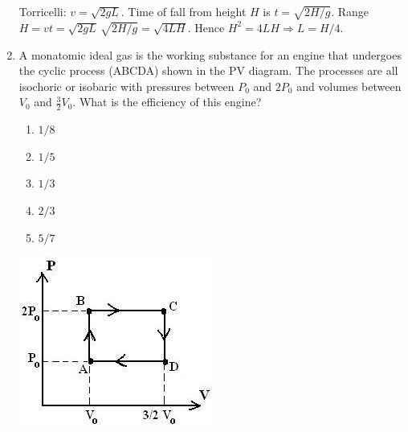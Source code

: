 \documentclass[12pt, a4paper]{article}
\begin{document}
\begin{CJK*}{UTF8}{gbsn}
\begin{enumerate}[itemsep=1.0em, topsep=0.6em]
\begin{solutionbox}
Torricelli: $v=\sqrt{2gL}$. Time of fall from height $H$ is $t=\sqrt{2H/g}$. Range $H=v t=\sqrt{2gL}\,\sqrt{2H/g}=\sqrt{4LH}$. Hence $H^2=4LH\Rightarrow L=H/4$.
\end{solutionbox}

\newpage

\item \label{prob:19}
\noindent\begin{minipage}[t]{0.6\linewidth}
\vspace{0pt}
A monatomic ideal gas is the working substance for an engine that undergoes the cyclic process (ABCDA) shown in the PV diagram. The processes are all isochoric or isobaric with pressures between $P_0$ and $2P_0$ and volumes between $V_0$ and $\frac{3}{2}V_0$. What is the efficiency of this engine?
\begin{enumerate}[label=(\Alph*)]
    \item $1/8$
    \item $1/5$
    \item $1/3$
    \item $2/3$
    \item $5/7$
\end{enumerate}
\end{minipage}%
\hfill
\begin{minipage}[t]{0.32\linewidth}
\vspace{0pt}
\centering
\includegraphics[width=\linewidth]{Problem_19_Figure.png}
\end{minipage}


\end{enumerate}
\end{CJK*}
\end{document}
